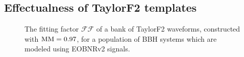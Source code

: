 \subsection{Effectualness of TaylorF2 templates}\label{s2:eob22f2}
\begin{figure}
  \begin{center}
  \end{center}
\caption{\label{fig:match_f2eob_f2eob22_all}The fitting factor $\mathcal{FF}$
of a bank of TaylorF2 waveforms, constructed with $\mathrm{MM} = 0.97$, 
for a population of BBH systems which are modeled using EOBNRv2 signals.} 
\end{figure}

